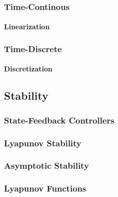             \subsubsection{Time-Continous} %

                \paragraph{Linearization} %

            \subsubsection{Time-Discrete} %

                \paragraph{Discretization} %

        \subsection{Stability} %

            \subsubsection{State-Feedback Controllers} %

            \subsubsection{Lyapunov Stability} %

            \subsubsection{Asymptotic Stability} %

            \subsubsection{Lyapunov Functions} %

